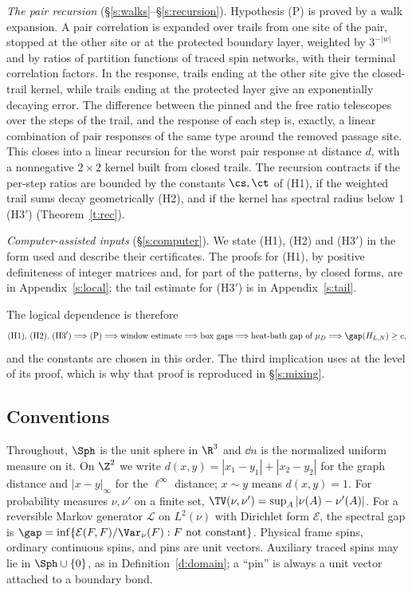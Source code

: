 \emph{The pair recursion} (\S\ref{s:walks}--\S\ref{s:recursion}). Hypothesis (P) is proved by a walk expansion. A pair correlation is expanded over trails from one site of the pair, stopped at the other site or at the protected boundary layer, weighted by $3^{-|w|}$ and by ratios of partition functions of traced spin networks, with their terminal correlation factors. In the response, trails ending at the other site give the closed-trail kernel, while trails ending at the protected layer give an exponentially decaying error. The difference between the pinned and the free ratio telescopes over the steps of the trail, and the response of each step is, exactly, a linear combination of pair responses of the same type around the removed passage site. This closes into a linear recursion for the worst pair response at distance $d$, with a nonnegative $2 \times 2$ kernel built from closed trails. The recursion contracts if the per-step ratios are bounded by the constants $\cs, \ct$ of (H1), if the weighted trail sums decay geometrically (H2), and if the kernel has spectral radius below $1$ (H3$'$) (Theorem~\ref{t:rec}).

\emph{Computer-assisted inputs} (\S\ref{s:computer}). We state (H1), (H2) and (H3$'$) in the form used and describe their certificates. The proofs for (H1), by positive definiteness of integer matrices and, for part of the patterns, by closed forms, are in Appendix~\ref{s:local}; the tail estimate for (H3$'$) is in Appendix~\ref{s:tail}.

The logical dependence is therefore
\begin{equation*}
\text{(H1), (H2), (H3$'$)} \Longrightarrow \text{(P)} \Longrightarrow \text{window estimate} \Longrightarrow \text{box gaps} \Longrightarrow \text{heat-bath gap of } \mu_D \Longrightarrow \gap(H_{L, N}) \ge c ,
\end{equation*}
and the constants are chosen in this order. The third implication uses \cite{MOS94} at the level of its proof, which is why that proof is reproduced in \S\ref{s:mixing}.

\subsection{Conventions}

Throughout, $\Sph$ is the unit sphere in $\R^3$ and $\dd n$ is the normalized uniform measure on it. On $\Z^2$ we write $d(x, y) = |x_1 - y_1| + |x_2 - y_2|$ for the graph distance and $|x - y|_\infty$ for the $\ell^\infty$ distance; $x \sim y$ means $d(x, y) = 1$. For probability measures $\nu, \nu'$ on a finite set, $\TV(\nu, \nu') = \sup_A |\nu(A) - \nu'(A)|$. For a reversible Markov generator $\mathcal L$ on $L^2(\nu)$ with Dirichlet form $\mathcal E$, the spectral gap is $\gap = \inf \{ \mathcal E(F, F) / \Var_\nu(F) : F \text{ not constant} \}$. Physical frame spins, ordinary continuous spins, and pins are unit vectors. Auxiliary traced spins may lie in $\Sph \cup \{0\}$, as in Definition~\ref{d:domain}; a ``pin'' is always a unit vector attached to a boundary bond.
